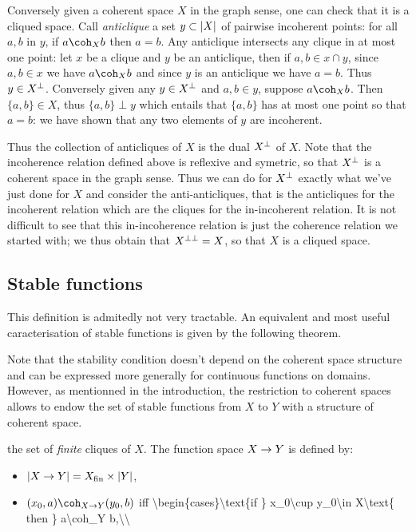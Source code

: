 Conversely given a coherent space \(X\) in the graph sense, one can
check that it is a cliqued space. Call \emph{anticlique} a set
\(y\subset \left|X\right|\) of pairwise incoherent points: for all \(a, b\) in
\(y\), if \(a\coh_X b\) then \(a=b\). Any anticlique intersects any
clique in at most one point: let \(x\) be a clique and \(y\) be an
anticlique, then if \(a,b\in x\cap y\), since \(a, b\in x\) we have
\(a\coh_X b\) and since \(y\) is an anticlique we have \(a = b\). Thus
\(y\in X^\bot\). Conversely given any \(y\in X^\bot\) and \(a, b\in y\),
suppose \(a\coh_X b\). Then \(\{a,b\}\in X\), thus \(\{a,b\}\perp y\)
which entails that \(\{a, b\}\) has at most one point so that \(a = b\):
we have shown that any two elements of \(y\) are incoherent.

Thus the collection of anticliques of \(X\) is the dual \(X^\bot\) of
\(X\). Note that the incoherence relation defined above is reflexive and
symetric, so that \(X^\bot\) is a coherent space in the graph sense.
Thus we can do for \(X^\bot\) exactly what we've just done for \(X\) and
consider the anti-anticliques, that is the anticliques for the
incoherent relation which are the cliques for the in-incoherent
relation. It is not difficult to see that this in-incoherence relation
is just the coherence relation we started with; we thus obtain that
\(X^{\bot\bot} = X\), so that \(X\) is a cliqued space.

\subsection{Stable functions}\label{stable-functions}

This definition is admitedly not very tractable. An equivalent and most
useful caracterisation of stable functions is given by the following
theorem.

Note that the stability condition doesn't depend on the coherent space
structure and can be expressed more generally for continuous functions
on domains. However, as mentionned in the introduction, the restriction
to coherent spaces allows to endow the set of stable functions from
\(X\) to \(Y\) with a structure of coherent space.

 the set of \emph{finite} cliques of \(X\). The function space
\(X\rightarrow Y\) is defined by:

\begin{itemize}
\tightlist
\item
  \(\left|X\rightarrow Y\right| = X_{\mathrm{fin}}\times \left|Y\right|\),
\item
  \((x_0, a)\coh_{X\imp Y}(y_0, b)\) iff
  \textbackslash{}begin\{cases\}\textbackslash{}text\{if \}
  x\_0\textbackslash{}cup y\_0\textbackslash{}in X\textbackslash{}text\{
  then \} a\textbackslash{}coh\_Y b,\textbackslash{}\textbackslash{}
\end{itemize}

